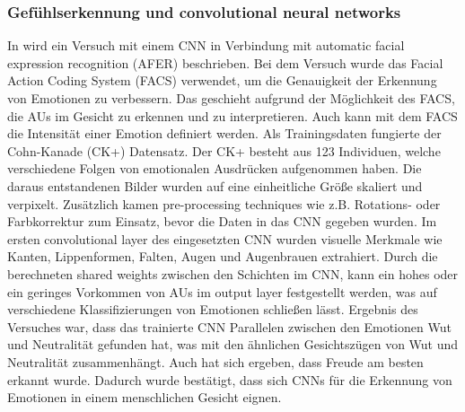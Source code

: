 \subsubsection*{Gefühlserkennung und convolutional neural networks}
In \cite{facialemotionrecusingcnn} wird ein Versuch mit einem CNN in Verbindung mit automatic facial expression recognition (AFER) beschrieben. Bei dem Versuch wurde das Facial Action Coding System (FACS) verwendet, um die Genauigkeit der Erkennung von Emotionen zu verbessern. Das geschieht aufgrund der Möglichkeit des FACS, die AUs im Gesicht zu erkennen und zu interpretieren. Auch kann mit dem FACS die Intensität einer Emotion definiert werden. Als Trainingsdaten fungierte der Cohn-Kanade (CK+) Datensatz. Der CK+ besteht aus 123 Individuen, welche verschiedene Folgen von emotionalen Ausdrücken aufgenommen haben. Die daraus entstandenen Bilder wurden auf eine einheitliche Größe skaliert und verpixelt. Zusätzlich kamen pre-processing techniques wie z.B. Rotations- oder Farbkorrektur zum Einsatz, bevor die Daten in das CNN gegeben wurden. Im ersten convolutional layer des eingesetzten CNN wurden visuelle Merkmale wie Kanten, Lippenformen, Falten, Augen und Augenbrauen extrahiert. Durch die berechneten shared weights zwischen den Schichten im CNN, kann ein hohes oder ein geringes Vorkommen von AUs im output layer festgestellt werden, was auf verschiedene Klassifizierungen von Emotionen schließen lässt. Ergebnis des Versuches war, dass das trainierte CNN Parallelen zwischen den Emotionen Wut und Neutralität gefunden hat, was mit den ähnlichen Gesichtszügen von Wut und Neutralität zusammenhängt. Auch hat sich ergeben, dass Freude am besten erkannt wurde. Dadurch wurde bestätigt, dass sich CNNs für die Erkennung von Emotionen in einem menschlichen Gesicht eignen.
\\
\\
